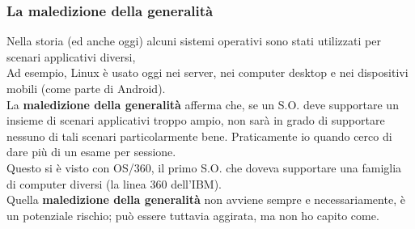 \subsubsection{La maledizione della generalità}
Nella storia (ed anche oggi) alcuni sistemi operativi sono stati utilizzati per scenari applicativi diversi,\\
Ad esempio, Linux è usato oggi nei server, nei computer desktop e nei dispositivi mobili (come parte di Android).\\
La \textbf{maledizione della generalità} afferma che, se un S.O. deve supportare un insieme di scenari applicativi troppo ampio, non sarà in grado di supportare nessuno di tali scenari particolarmente
bene. Praticamente io quando cerco di dare più di un esame per sessione.\\
Questo si è visto con OS/360, il primo S.O. che doveva supportare una famiglia di computer diversi (la linea 360 dell'IBM).\\
Quella \textbf{maledizione della generalità} non avviene sempre e necessariamente, è un potenziale rischio; può essere tuttavia aggirata, ma non ho capito come.

